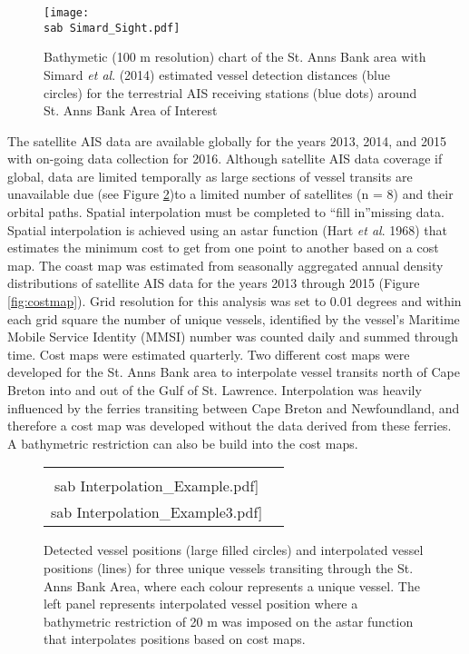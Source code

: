 \documentclass[letterpaper,portrait,11pt]{scrartcl}
\numberwithin{equation}{section}		%
\numberwithin{figure}{section}			%
\numberwithin{table}{section}				%
\newcommand{\ecomod}{\string~/ecomod_data/}   %
\newcommand{\sab}{\ecomod/mpa/sab/}   %
\begin{document}
\begin{figure}[h]
	\centering
	\texttt{[image: \\sab Simard\_Sight.pdf]}
	\caption{Bathymetic (100 m resolution) chart of the  St. Anns Bank area with Simard \textit{et al}. (2014) estimated vessel detection distances (blue circles) for the terrestrial AIS receiving stations (blue dots) around St. Anns Bank Area of Interest}
	\label{fig:DetAIS}
\end{figure}


The satellite AIS data are available globally for the years 2013, 2014, and 2015 with on-going data collection for 2016. Although satellite AIS data coverage if global, data are limited temporally as large sections of vessel transits are unavailable due (see Figure \ref{fig:astar})to a limited number of satellites (n = 8) and their orbital paths.  Spatial interpolation must be completed to \textquotedblleft fill in\textquotedblright  missing data.  Spatial interpolation is achieved using an astar function (Hart \textit{et al}. 1968)  that estimates the minimum cost to get from one point to another based on a cost map.  The coast map was estimated from seasonally aggregated annual density distributions of satellite AIS data for the years 2013 through 2015 (Figure \ref{fig:costmap}).  Grid resolution for this analysis was set to 0.01 degrees and within each grid square the number of unique vessels, identified by the vessel’s Maritime Mobile Service Identity (MMSI) number was counted daily and summed through time.  Cost maps were estimated quarterly.  Two different cost maps were developed for the St. Anns Bank area to interpolate vessel transits north of Cape Breton into and out of the Gulf of St. Lawrence.  Interpolation was heavily influenced by the ferries transiting between Cape Breton and Newfoundland, and therefore a cost map was developed without the data derived from these ferries.  A bathymetric restriction can also be build into the cost maps.

\begin{figure}[h]
	\centering
	\begin{tabular}{cc}
	\texttt{[image: \\sab Interpolation\_Example.pdf]} &
    \texttt{[image: \\sab Interpolation\_Example3.pdf]}
	\end{tabular}
	\caption{Detected vessel positions (large filled circles) and interpolated vessel positions (lines) for three unique vessels transiting through the St. Anns Bank Area, where each colour represents a unique vessel. The left panel represents interpolated vessel position where a bathymetric restriction of 20 m was imposed on the astar function that interpolates positions based on cost maps.}
	\label{fig:astar}
\end{figure}
\end{document}
